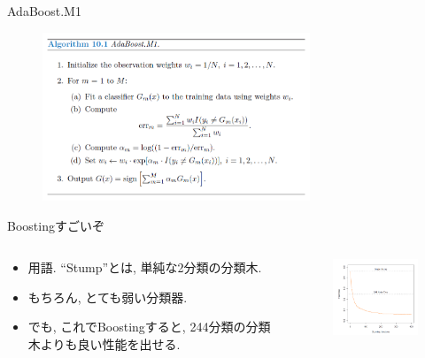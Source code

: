 \documentclass[dvipdfmx,8pt]{beamer}
\begin{document}
  \begin{frame}{AdaBoost.M1}
    \begin{figure}[htb]
      \centering
      \includegraphics[width=8cm,clip]{images/AdaBoost.png}
    \end{figure}
  \end{frame}
  \begin{frame}{Boostingすごいぞ}
    \begin{columns}[t]
      \begin{column}{0.5\linewidth}
        \begin{itemize}
          \item 用語. ``Stump''とは, 単純な2分類の分類木.
          \item もちろん, とても弱い分類器.
          \item でも, これでBoostingすると, 244分類の分類木よりも良い性能を出せる.
        \end{itemize}
      \end{column}
      \begin{column}{0.5\linewidth}
        \begin{figure}[htb]
          \centering
          \includegraphics[width=5cm,clip]{images/StumpBoosting.png}
        \end{figure}
      \end{column}
    \end{columns}
  \end{frame}
\end{document}
